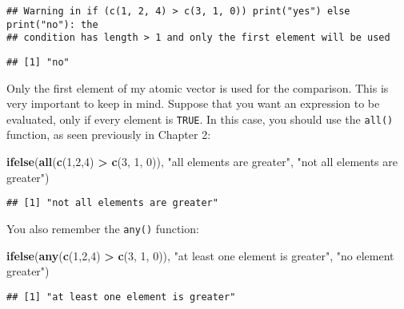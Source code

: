 \documentclass[
]{article}
\newenvironment{Shaded}{\begin{snugshade}}{\end{snugshade}}
\newcommand{\DecValTok}[1]{\textcolor[rgb]{0.00,0.00,0.81}{#1}}
\newcommand{\KeywordTok}[1]{\textcolor[rgb]{0.13,0.29,0.53}{\textbf{#1}}}
\newcommand{\NormalTok}[1]{#1}
\newcommand{\OperatorTok}[1]{\textcolor[rgb]{0.81,0.36,0.00}{\textbf{#1}}}
\newcommand{\StringTok}[1]{\textcolor[rgb]{0.31,0.60,0.02}{#1}}
\begin{document}
\begin{verbatim}
## Warning in if (c(1, 2, 4) > c(3, 1, 0)) print("yes") else print("no"): the
## condition has length > 1 and only the first element will be used
\end{verbatim}

\begin{verbatim}
## [1] "no"
\end{verbatim}

Only the first element of my atomic vector is used for the comparison. This is very important to keep in mind.
Suppose that you want an expression to be evaluated, only if every element is \texttt{TRUE}. In this case, you should
use the \texttt{all()} function, as seen previously in Chapter 2:

\begin{Shaded}
\begin{Highlighting}[]
\KeywordTok{ifelse}\NormalTok{(}\KeywordTok{all}\NormalTok{(}\KeywordTok{c}\NormalTok{(}\DecValTok{1}\NormalTok{,}\DecValTok{2}\NormalTok{,}\DecValTok{4}\NormalTok{) }\OperatorTok{\textgreater{}}\StringTok{ }\KeywordTok{c}\NormalTok{(}\DecValTok{3}\NormalTok{, }\DecValTok{1}\NormalTok{, }\DecValTok{0}\NormalTok{)), }\StringTok{"all elements are greater"}\NormalTok{, }\StringTok{"not all elements are greater"}\NormalTok{)}
\end{Highlighting}
\end{Shaded}

\begin{verbatim}
## [1] "not all elements are greater"
\end{verbatim}

You also remember the \texttt{any()} function:

\begin{Shaded}
\begin{Highlighting}[]
\KeywordTok{ifelse}\NormalTok{(}\KeywordTok{any}\NormalTok{(}\KeywordTok{c}\NormalTok{(}\DecValTok{1}\NormalTok{,}\DecValTok{2}\NormalTok{,}\DecValTok{4}\NormalTok{) }\OperatorTok{\textgreater{}}\StringTok{ }\KeywordTok{c}\NormalTok{(}\DecValTok{3}\NormalTok{, }\DecValTok{1}\NormalTok{, }\DecValTok{0}\NormalTok{)), }\StringTok{"at least one element is greater"}\NormalTok{, }\StringTok{"no element greater"}\NormalTok{)}
\end{Highlighting}
\end{Shaded}

\begin{verbatim}
## [1] "at least one element is greater"
\end{verbatim}
\end{document}
